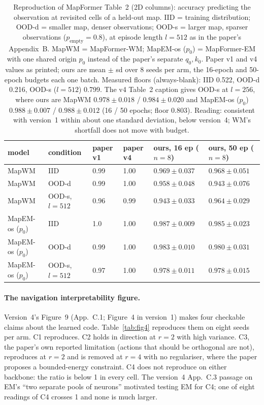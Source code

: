 \documentclass[10pt]{article}
\begin{document}
\begin{table}[t]
\centering
\small
\captionsetup{font=footnotesize,skip=4pt}
\caption{Reproduction of MapFormer Table~2 (2D columns): accuracy predicting the observation at revisited cells of a held-out map. IID = training distribution; OOD-d = smaller map, denser observations; OOD-s = larger map, sparser observations ($p_{\mathrm{empty}}=0.8$), at episode length $l=512$ as in the paper's Appendix~B. MapWM = MapFormer-WM; MapEM-os ($p_0$) = MapFormer-EM with one shared origin $p_0$ instead of the paper's separate $q_0,k_0$. Paper v1 and v4 values as printed; ours are mean $\pm$ sd over 8 seeds per arm, the 16-epoch and 50-epoch budgets each one batch. Measured floors (always-blank): IID 0.522, OOD-d 0.216, OOD-s ($l=512$) 0.799. The v4 Table~2 caption gives OOD-s at $l=256$, where ours are MapWM $0.978\pm0.018$ / $0.984\pm0.020$ and MapEM-os ($p_0$) $0.988\pm0.007$ / $0.988\pm0.012$ (16 / 50 epochs; floor 0.803). Reading: consistent with version~1 within about one standard deviation, below version~4; WM's shortfall does not move with budget.}
\label{tab:repro}
\begin{tabular}{@{}llllll@{}}
\toprule
model & condition & paper v1 & paper v4 & ours, 16 ep ($n=8$) & ours, 50 ep ($n=8$) \\
\midrule
MapWM    & IID            & 0.99 & 1.00 & $0.969\pm0.037$ & $0.968\pm0.051$ \\
MapWM    & OOD-d          & 0.99 & 1.00 & $0.958\pm0.048$ & $0.943\pm0.076$ \\
MapWM    & OOD-s, $l=512$ & 0.96 & 0.99 & $0.943\pm0.033$ & $0.964\pm0.029$ \\
MapEM-os ($p_0$) & IID            & 1.0  & 1.00 & $0.987\pm0.009$ & $0.985\pm0.023$ \\
MapEM-os ($p_0$) & OOD-d          & 0.99 & 1.00 & $0.983\pm0.010$ & $0.980\pm0.031$ \\
MapEM-os ($p_0$) & OOD-s, $l=512$ & 0.97 & 1.00 & $0.978\pm0.011$ & $0.978\pm0.015$ \\
\bottomrule
\end{tabular}
\end{table}

\paragraph{The navigation interpretability figure.} Version~4's Figure~9 (App.~C.1; Figure~4 in
version~1) makes four checkable claims about the learned code. Table~\ref{tab:fig4} reproduces them
on eight seeds per arm. C1 reproduces. C2 holds in direction at $r=2$ with high variance. C3, the
paper's own reported limitation (actions that should be orthogonal are not), reproduces at $r=2$ and
is removed at $r=4$ with no regulariser, where the paper proposes a bounded-energy constraint. C4 does
not reproduce on either backbone: the ratio is below 1 in every cell. The version~4 App.~C.3 passage
on EM's ``two separate pools of neurons'' motivated testing EM for C4; one of eight readings of C4
crosses 1 and none is much larger. %
\end{document}
